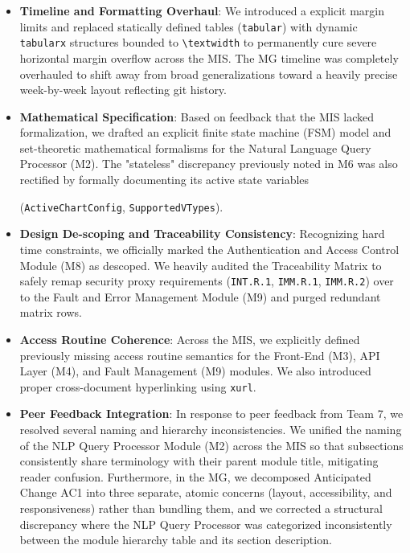 \documentclass{article}
\begin{document}
\begin{itemize}
    \item \textbf{Timeline and Formatting Overhaul}: We introduced a explicit margin limits and replaced statically defined tables (\texttt{tabular}) with dynamic \texttt{tabularx} structures bounded to \verb|\textwidth| to permanently cure severe horizontal margin overflow across the MIS. The MG timeline was completely overhauled to shift away from broad generalizations toward a heavily precise week-by-week layout reflecting git history.
    \item \textbf{Mathematical Specification}: Based on feedback that the MIS lacked formalization, we drafted an explicit finite state machine (FSM) model and set-theoretic mathematical formalisms for the Natural Language Query Processor (M2). The "stateless" discrepancy previously noted in M6 was also rectified by formally documenting its active state variables 
    
    (\texttt{ActiveChartConfig}, \texttt{SupportedVTypes}).
    \item \textbf{Design De-scoping and Traceability Consistency}: Recognizing hard time constraints, we officially marked the Authentication and Access Control Module (M8) as descoped. We heavily audited the Traceability Matrix to safely remap security proxy requirements (\texttt{INT.R.1}, \texttt{IMM.R.1}, \texttt{IMM.R.2}) over to the Fault and Error Management Module (M9) and purged redundant matrix rows. 
    \item \textbf{Access Routine Coherence}: Across the MIS, we explicitly defined previously missing access routine semantics for the Front-End (M3), API Layer (M4), and Fault Management (M9) modules. We also introduced proper cross-document hyperlinking using \texttt{xurl}.
    \item \textbf{Peer Feedback Integration}: In response to peer feedback from Team 7, we resolved several naming and hierarchy inconsistencies. We unified the naming of the NLP Query Processor Module (M2) across the MIS so that subsections consistently share terminology with their parent module title, mitigating reader confusion. Furthermore, in the MG, we decomposed Anticipated Change AC1 into three separate, atomic concerns (layout, accessibility, and responsiveness) rather than bundling them, and we corrected a structural discrepancy where the NLP Query Processor was categorized inconsistently between the module hierarchy table and its section description.
    
\end{itemize}
\end{document}
